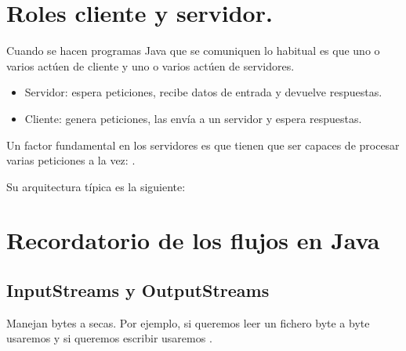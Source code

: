 \documentclass[letterpaper,10pt,spanish]{sphinxmanual}
\begin{document}
\section{Roles cliente y servidor.}
\label{\detokenize{textos/tema3:roles-cliente-y-servidor}}
Cuando se hacen programas Java que se comuniquen lo habitual es que uno o varios actúen de cliente y uno o varios actúen de servidores.
\begin{itemize}
\item {} 
Servidor: espera peticiones, recibe datos de entrada y devuelve respuestas.

\item {} 
Cliente: genera peticiones, las envía a un servidor y espera respuestas.

\end{itemize}

Un factor fundamental en los servidores es que tienen que ser capaces de procesar varias peticiones a la vez: .

Su arquitectura típica es la siguiente:

%
\begin{sphinxVerbatim}[commandchars=\\\{\}]
 
         
\end{sphinxVerbatim}


\section{Recordatorio de los flujos en Java}
\label{\detokenize{textos/tema3:recordatorio-de-los-flujos-en-java}}

\subsection{InputStreams y OutputStreams}
\label{\detokenize{textos/tema3:inputstreams-y-outputstreams}}
Manejan bytes a secas. Por ejemplo, si queremos leer un fichero byte a byte usaremos  y si queremos escribir usaremos .
\end{document}
